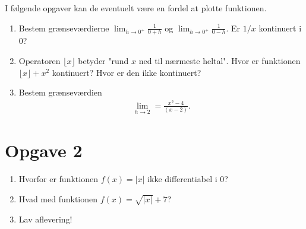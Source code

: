 I følgende opgaver kan de eventuelt være en fordel at plotte funktionen.
\begin{enumerate}[label=\roman*)]
\item Bestem grænseværdierne $\lim_{h\to 0^+}\frac{1}{0+h}$ og $\lim_{h \to 0^+}\frac{1}{0-h}$. Er $1/x$ kontinuert i $0$? 
\item Operatoren $\lfloor x \rfloor$ betyder "rund $x$ ned til nærmeste heltal". Hvor er funktionen $\lfloor x\rfloor +x^2$ kontinuert? Hvor er den ikke kontinuert?
\item Bestem grænseværdien
\begin{align*}
\lim_{h\to 2} = \frac{x^2-4}{(x-2)}.
\end{align*} 

\end{enumerate}

\section*{Opgave 2}

\begin{enumerate}[label=\roman*)]
\item Hvorfor er funktionen $f(x) = |x|$ ikke differentiabel i $0$? 
\item Hvad med funktionen $f(x) = \sqrt{|x|}+7$?
\item Lav aflevering!
\end{enumerate}

